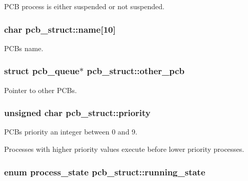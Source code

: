 P\+CB process is either suspended or not suspended. 

\subsubsection[{\texorpdfstring{name}{name}}]{\setlength{\rightskip}{0pt plus 5cm}char pcb\+\_\+struct\+::name\mbox{[}10\mbox{]}}\hypertarget{structpcb__struct_a2bd5a2bbfc9b13812cec1c884077930e}{}\label{structpcb__struct_a2bd5a2bbfc9b13812cec1c884077930e}


P\+CB\textquotesingle{}s name. 

\subsubsection[{\texorpdfstring{other\+\_\+pcb}{other_pcb}}]{\setlength{\rightskip}{0pt plus 5cm}struct {\bf pcb\+\_\+queue}$\ast$ pcb\+\_\+struct\+::other\+\_\+pcb}\hypertarget{structpcb__struct_aba9f99ef03e34c9f9ef79053a255ba27}{}\label{structpcb__struct_aba9f99ef03e34c9f9ef79053a255ba27}


Pointer to other P\+C\+Bs. 

\subsubsection[{\texorpdfstring{priority}{priority}}]{\setlength{\rightskip}{0pt plus 5cm}unsigned char pcb\+\_\+struct\+::priority}\hypertarget{structpcb__struct_aff2a92397b2ef3d680c09934ecd5f032}{}\label{structpcb__struct_aff2a92397b2ef3d680c09934ecd5f032}


P\+CB\textquotesingle{}s priority an integer between 0 and 9. 

Processes with higher priority values execute before lower priority processes. 
\subsubsection[{\texorpdfstring{running\+\_\+state}{running_state}}]{\setlength{\rightskip}{0pt plus 5cm}enum {\bf process\+\_\+state} pcb\+\_\+struct\+::running\+\_\+state}\hypertarget{structpcb__struct_a374d522318eb94188698cbb5bd85009d}{}\label{structpcb__struct_a374d522318eb94188698cbb5bd85009d}


